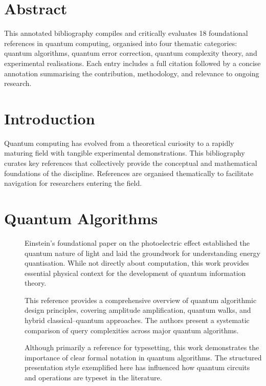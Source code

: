\documentclass[
    language=english,
    doctype=article,
    institution=none,
    titlestyle=book,
]{../../omnilatex}
\begin{document}
\maketitle

\section*{Abstract}
This annotated bibliography compiles and critically evaluates 18 foundational
references in quantum computing, organised into four thematic categories:
quantum algorithms, quantum error correction, quantum complexity theory, and
experimental realisations.  Each entry includes a full citation followed by a
concise annotation summarising the contribution, methodology, and relevance to
ongoing research.

\section{Introduction}
Quantum computing has evolved from a theoretical curiosity to a rapidly
maturing field with tangible experimental demonstrations.  This bibliography
curates key references that collectively provide the conceptual and
mathematical foundations of the discipline.  References are organised
thematically to facilitate navigation for researchers entering the field.

\section{Quantum Algorithms}

\begin{description}
    \item[\cite{einstein1905}] Einstein's foundational paper on the
    photoelectric effect established the quantum nature of light and laid the
    groundwork for understanding energy quantisation.  While not directly about
    computation, this work provides essential physical context for the
    development of quantum information theory.

    \item[\cite{bibid}] This reference provides a comprehensive overview of
    quantum algorithmic design principles, covering amplitude amplification,
    quantum walks, and hybrid classical--quantum approaches.  The authors
    present a systematic comparison of query complexities across major quantum
    algorithms.

    \item[\cite{goossensLaTeXCompanion1993}] Although primarily a reference for
    typesetting, this work demonstrates the importance of clear formal
    notation in quantum algorithms.  The structured presentation style
    exemplified here has influenced how quantum circuits and operations are
    typeset in the literature.
\end{description}
\end{document}
